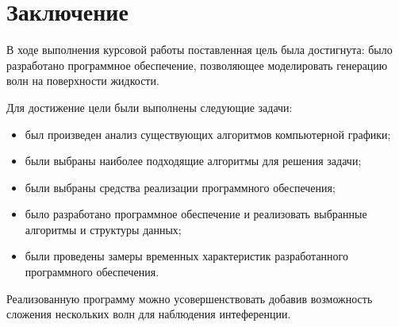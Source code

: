 \chapter*{Заключение}

В ходе выполнения курсовой работы поставленная цель была достигнута: 
было разработано программное обеспечение, позволяющее моделировать 
генерацию волн на поверхности жидкости.

Для достижение цели были выполнены следующие задачи:
\begin{itemize}
    \item был произведен анализ существующих алгоритмов компьютерной графики;
    \item были выбраны наиболее подходящие алгоритмы для решения задачи;
    \item были выбраны средства реализации программного обеспечения;
    \item было разработано программное обеспечение и реализовать выбранные алгоритмы и структуры данных;
    \item были проведены замеры временных характеристик разработанного программного обеспечения.
\end{itemize}

Реализованную программу можно усовершенствовать добавив возможность сложения нескольких волн для наблюдения интеференции.
